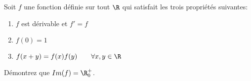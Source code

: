 
\begin{exercice}\label{exo0099}


Soit $f$ une fonction définie sur tout $\R$ qui satisfait les trois propriétés suivantes:
\begin{enumerate}
\item
$f$ est dérivable et $f'=f$
\item
$f(0) = 1$
\item
$f(x+y)=f(x)f(y) \qquad \forall x,y \in \R$
\end{enumerate}
Démontrez que $Im(f) = \R_0^+$.

\end{exercice}
